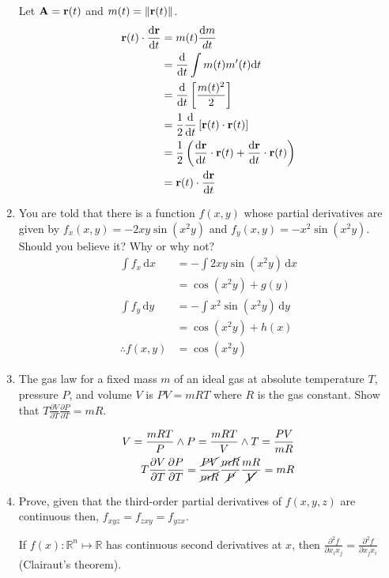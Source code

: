\documentclass[11pt]{article}
\renewcommand{\vec}[1]{\ensuremath\mathbf{#1}}
\begin{document}
\begin{enumerate}
  Let \(\vec{A} = \vec{r}(t)\) and \(m(t) = \lVert \vec{r}(t) \rVert\).
  \begin{align*}
    \vec{r}(t) \cdot \frac{\mathrm{d}\vec{r}}{\mathrm{d}t}
    &= m(t) \frac{\mathrm{d}m}{dt} \\
    &= \frac{\mathrm{d}}{\mathrm{d}t} \int m(t)m'(t) \mathrm{d}t \\
    &= \frac{\mathrm{d}}{\mathrm{d}t} \left[ \frac{m(t)^2}{2} \right] \\
    &= \frac{1}{2} \frac{\mathrm{d}}{\mathrm{d}t} \left[ \vec{r}(t) \cdot
      \vec{r}(t) \right] \\
    &= \frac{1}{2} \left( \frac{\mathrm{d}\vec{r}}{\mathrm{d}t} \cdot
      \vec{r}(t) + \frac{\mathrm{d}\vec{r}}{\mathrm{d}t} \cdot \vec{r}(t) \right) \\
    &= \vec{r}(t) \cdot \frac{\mathrm{d}\vec{r}}{\mathrm{d}t}
  \end{align*}

\item You are told that there is a function \(f(x, y)\) whose partial
    derivatives are given by \(f_x(x, y) = -2xy \sin(x^2y)\) and \(f_y(x, y) =
    -x^2 \sin(x^2y)\). Should you believe it? Why or why not?
    \begin{align*}
      \int f_x \,\mathrm{d}x &= -\int 2xy \sin(x^2y) \,\mathrm{d}x \\
                           &= \cos(x^2y) + g(y) \\
      \int f_y \,\mathrm{d}y &= -\int x^2 \sin(x^2y) \,\mathrm{d}y \\
                           &= \cos(x^2y) + h(x) \\
      \therefore f(x, y) &= \cos(x^2y)
    \end{align*}

  \item The gas law for a fixed mass \(m\) of an ideal gas at absolute
    temperature \(T\), pressure \(P\), and volume \(V\) is \(PV = mRT\) where
    \(R\) is the gas constant. Show that \(T \frac{\partial V}{\partial T}
    \frac{\partial P}{\partial T} = mR\).

    \begin{align*}
      V = \frac{mRT}{P} \land P = \frac{mRT}{V} \land T = \frac{PV}{mR} \\
      T \frac{\partial V}{\partial T}
    \frac{\partial P}{\partial T} = \frac{\cancel{PV}}{\cancel{mR}} \frac{\cancel{mR}}{\cancel{P}} \frac{mR}{\cancel{V}} = mR
    \end{align*}

    \item Prove, given that the third-order partial derivatives of \(f(x, y,
      z)\) are continuous then, \(f_{xyz} = f_{zxy} = f_{yzx}\).

      If \(f(x) : \mathbb{R}^n \mapsto \mathbb{R}\) has continuous second
  derivatives at \(x\), then \(\frac{\partial^2 f}{\partial x_ix_j} =
  \frac{\partial^2 f}{\partial x_jx_i}\) (Clairaut's theorem).

\end{enumerate}
\end{document}
